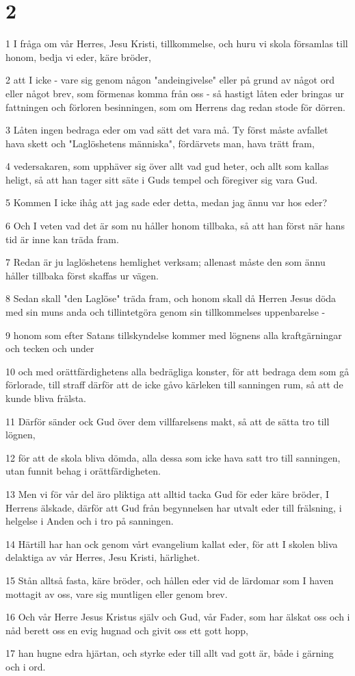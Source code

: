 \chapter{2}

\par 1 I fråga om vår Herres, Jesu Kristi, tillkommelse, och huru vi skola församlas till honom, bedja vi eder, käre bröder,
\par 2 att I icke - vare sig genom någon "andeingivelse" eller på grund av något ord eller något brev, som förmenas komma från oss - så hastigt låten eder bringas ur fattningen och förloren besinningen, som om Herrens dag redan stode för dörren.
\par 3 Låten ingen bedraga eder om vad sätt det vara må. Ty först måste avfallet hava skett och "Laglöshetens människa", fördärvets man, hava trätt fram,
\par 4 vedersakaren, som upphäver sig över allt vad gud heter, och allt som kallas heligt, så att han tager sitt säte i Guds tempel och föregiver sig vara Gud.
\par 5 Kommen I icke ihåg att jag sade eder detta, medan jag ännu var hos eder?
\par 6 Och I veten vad det är som nu håller honom tillbaka, så att han först när hans tid är inne kan träda fram.
\par 7 Redan är ju laglöshetens hemlighet verksam; allenast måste den som ännu håller tillbaka först skaffas ur vägen.
\par 8 Sedan skall "den Laglöse" träda fram, och honom skall då Herren Jesus döda med sin muns anda och tillintetgöra genom sin tillkommelses uppenbarelse -
\par 9 honom som efter Satans tillskyndelse kommer med lögnens alla kraftgärningar och tecken och under
\par 10 och med orättfärdighetens alla bedrägliga konster, för att bedraga dem som gå förlorade, till straff därför att de icke gåvo kärleken till sanningen rum, så att de kunde bliva frälsta.
\par 11 Därför sänder ock Gud över dem villfarelsens makt, så att de sätta tro till lögnen,
\par 12 för att de skola bliva dömda, alla dessa som icke hava satt tro till sanningen, utan funnit behag i orättfärdigheten.
\par 13 Men vi för vår del äro pliktiga att alltid tacka Gud för eder käre bröder, I Herrens älskade, därför att Gud från begynnelsen har utvalt eder till frälsning, i helgelse i Anden och i tro på sanningen.
\par 14 Härtill har han ock genom vårt evangelium kallat eder, för att I skolen bliva delaktiga av vår Herres, Jesu Kristi, härlighet.
\par 15 Stån alltså fasta, käre bröder, och hållen eder vid de lärdomar som I haven mottagit av oss, vare sig muntligen eller genom brev.
\par 16 Och vår Herre Jesus Kristus själv och Gud, vår Fader, som har älskat oss och i nåd berett oss en evig hugnad och givit oss ett gott hopp,
\par 17 han hugne edra hjärtan, och styrke eder till allt vad gott är, både i gärning och i ord.

